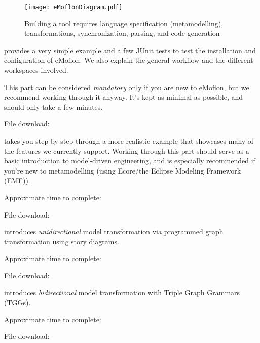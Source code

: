 \vspace*{2cm}
\begin{figure}[htbp]
	\centering
  \texttt{[image: eMoflonDiagram.pdf]}
	\caption{Building a tool requires language specification (metamodelling), transformations, synchronization, parsing, and code generation}
	\label{fig:transModel}
\end{figure}
\begin{description}

\pagebreak

\item[Part I: Installation and set up] provides a very simple example and a few JUnit tests to test the installation and configuration of eMoflon. We also
explain the general workflow and the different workspaces involved.

This part can be considered \emph{mandatory} only if you are new to eMoflon, but we recommend working through it anyway.
It's kept as minimal as possible, and should only take a few minutes.

{\small File download: \dlPartOne}

\vspace{0.5cm}
\item[Part II: Ecore] takes you step-by-step through a more realistic example that showcases many of the features we currently support.
Working through this part should serve as a basic introduction to model-driven engineering, and is especially recommended if you're new to me\-ta\-mo\-del\-ling
(using Ecore/the Eclipse Modeling Framework (EMF)).

{\small Approximate time to complete: \timeTwo
 
File download: \dlPartTwo}

\vspace{0.5cm}
\item[Part III: Story Driven Modeling (SDM)] introduces \emph{unidirectional} mo\-del transformation via programmed graph transformation using story diagrams.

{\small Approximate time to complete: \timeThree
 
File download: \dlPartThree}

\vspace{0.5cm}
\item[Part IV: TGGs] introduces \emph{bidirectional} model transformation with Triple Graph Grammars (TGGs).

{\small Approximate time to complete: \timeFour
 
File download: \dlPartFour}


\end{description}
